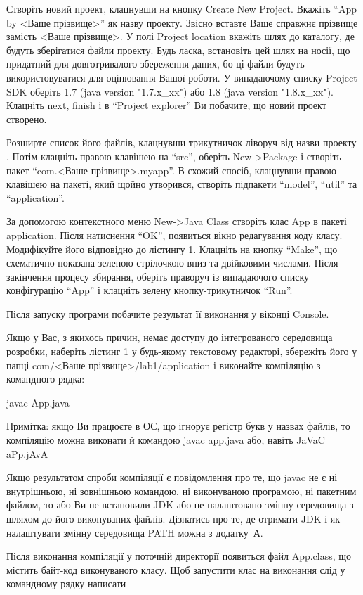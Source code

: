Створіть новий проект, клацнувши на кнопку Create New Project.
Вкажіть ``App by <Ваше прізвище>'' як назву проекту. Звісно вставте Ваше справжнє прізвище замість <Ваше прізвище>. 
У полі Project location вкажіть шлях до каталогу, де будуть зберігатися файли проекту. Будь ласка, встановіть цей шлях на носії, що придатний для довготривалого збереження даних, бо ці файли будуть використовуватися для оцінювання Вашої роботи.
У випадаючому списку Project SDK оберіть 1.7 (java version "1.7.x\_xx") або 1.8 (java version "1.8.x\_xx"). Клацніть next, finish і в ``Project explorer'' Ви побачите, що новий проект створено.
 
Розширте список його файлів, клацнувши трикутничок ліворуч від назви проекту . 
 Потім клацніть правою клавішею на ``src'', оберіть New->Package і створіть пакет ``com.<Ваше прізвище>.myapp''. В схожий спосіб, клацнувши правою клавішею на пакеті, який щойно утворився, створіть підпакети ``model'', ``util'' та ``application''.
 
За допомогою контекстного меню New->Java Class створіть клас App в пакеті application. Після натиснення ``OK'', появиться вікно редагування коду класу. Модифікуйте його відповідно до лістингу 1.
Клацніть на кнопку ``Make'', що схематично показана зеленою стрілочкою вниз та двійковими числами. Після закінчення процесу збирання, оберіть праворуч із випадаючого списку  конфігурацію ``App'' і клацніть зелену кнопку-трикутничок ``Run''.
 
Після запуску програми побачите результат її виконання у віконці Console.

Якщо у Вас, з якихось причин, немає доступу до інтегрованого середовища розробки, наберіть лістинг 1 у будь-якому текстовому редакторі, збережіть його у папці com/<Ваше прізвище>/lab1/application і виконайте компіляцію з командного рядка: 

javac App.java

Примітка: якщо Ви працюєте в ОС, що ігнорує регістр букв у назвах файлів, то компіляцію можна виконати й командою javac app.java або, навіть JaVaC aPp.jAvA

Якщо результатом спроби компіляції є повідомлення про те, що javac не є ні внутрішньою, ні зовнішньою командою, ні виконуваною програмою, ні пакетним файлом, то або Ви не встановили JDK або не налаштовано змінну середовища з шляхом до його виконуваних файлів. Дізнатись про те, де отримати JDK і як налаштувати змінну середовища PATH можна з додатку~А.

Після виконання компіляції у поточній директорії появиться файл App.class, що містить байт-код виконуваного класу. Щоб запустити клас на виконання слід у командному рядку написати 

